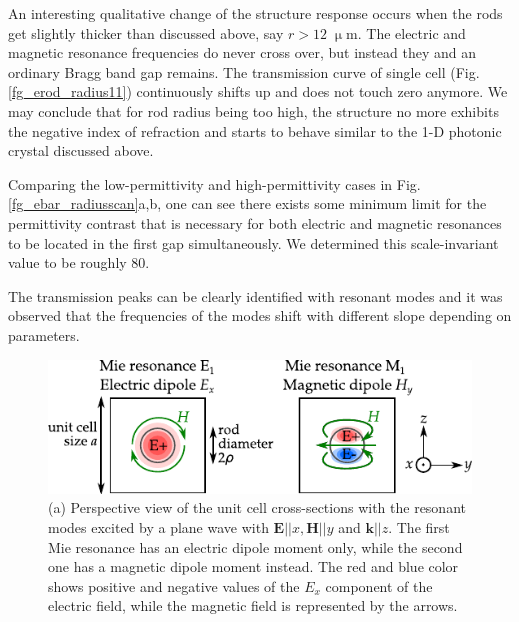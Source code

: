 {An interesting qualitative change of the structure response occurs when the rods get slightly thicker than discussed above, say $r > 12\;\upmu$m. The electric and magnetic resonance frequencies do never cross over, but instead they  and an ordinary Bragg band gap remains. The transmission curve of single cell (Fig. \ref{fg_erod_radius11}) continuously shifts up and does not touch zero anymore. We may conclude that for rod radius being too high, the structure no more exhibits the negative index of refraction and starts to behave similar to the 1-D photonic crystal discussed above.


Comparing the low-permittivity and high-permittivity cases in Fig. \ref{fg_ebar_radiusscan}a,b, one can see there exists some minimum limit for the permittivity contrast that is necessary for both electric and magnetic resonances to be located in the first gap simultaneously. We determined this scale-invariant value to be roughly 80.

The transmission peaks can be clearly identified with resonant modes and it was observed that the frequencies of the modes shift with different slope depending on parameters.  
} 




\begin{figure} \centering \includegraphics[width=14cm]{img/ERods_1st_and_2nd_Mie_resonance.pdf}%
\caption{(a) Perspective view of the unit cell cross-sections with the resonant modes excited by a plane wave with $\mathbf{E}||x, \mathbf{H}||y$ and $\mathbf{k}||z$. The first Mie resonance has an electric dipole moment only, while the second one has a magnetic dipole moment instead. The red and blue color shows positive and negative values of the $E_x$ component of the electric field, while the magnetic field is represented by the arrows. } \label{fg_sketchfield} \end{figure}

